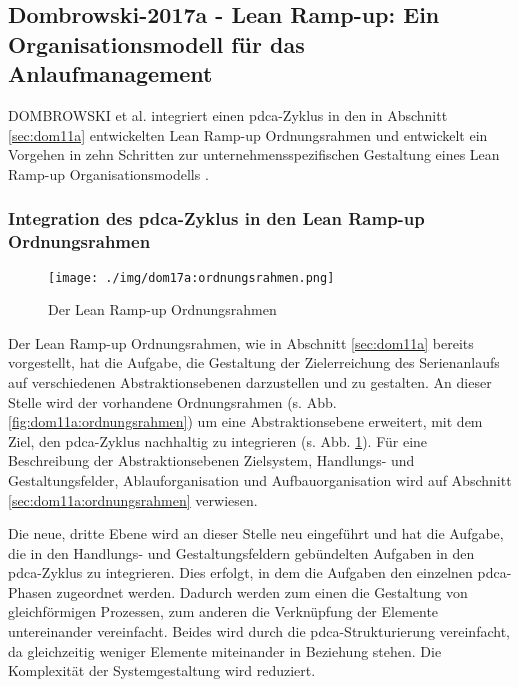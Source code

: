 \subsection*{Dombrowski-2017a - Lean Ramp-up: Ein Organisationsmodell für das Anlaufmanagement}

DOMBROWSKI et al. integriert einen \gls{pdca}-Zyklus in den in Abschnitt \ref{sec:dom11a} entwickelten Lean Ramp-up Ordnungsrahmen und entwickelt ein Vorgehen in zehn Schritten zur unternehmensspezifischen Gestaltung eines Lean Ramp-up Organisationsmodells \autocite{Dombrowski2017a}. 

\subsubsection{Integration des \gls{pdca}-Zyklus in den Lean Ramp-up Ordnungsrahmen}
\begin{figure}[h]
 \centering
 \texttt{[image: ./img/dom17a:ordnungsrahmen.png]}
 \caption[Der Lean Ramp-up Ordnungsrahmen]{Der Lean Ramp-up Ordnungsrahmen \autocite{Dombrowski2017a}}
 \label{fig:dom17a:ordnungsrahmen}
\end{figure}

Der Lean Ramp-up Ordnungsrahmen, wie in Abschnitt \ref{sec:dom11a} bereits vorgestellt, hat die Aufgabe, die Gestaltung der Zielerreichung des Serienanlaufs auf verschiedenen Abstraktionsebenen darzustellen und zu gestalten. 
An dieser Stelle wird der vorhandene Ordnungsrahmen (s. Abb. \ref{fig:dom11a:ordnungsrahmen}) um eine Abstraktionsebene erweitert, mit dem Ziel, den \gls{pdca}-Zyklus nachhaltig zu integrieren (s. Abb. \ref{fig:dom17a:ordnungsrahmen}). 
Für eine Beschreibung der Abstraktionsebenen Zielsystem, Handlungs- und Gestaltungsfelder, Ablauforganisation und Aufbauorganisation wird auf Abschnitt \ref{sec:dom11a:ordnungsrahmen} verwiesen. 

Die neue, dritte Ebene wird an dieser Stelle neu eingeführt und hat die Aufgabe, die in den Handlungs- und Gestaltungsfeldern gebündelten Aufgaben in den \gls{pdca}-Zyklus zu integrieren. Dies erfolgt, in dem die Aufgaben den einzelnen \gls{pdca}-Phasen zugeordnet werden. Dadurch werden zum einen die Gestaltung von gleichförmigen Prozessen, zum anderen die Verknüpfung der Elemente untereinander vereinfacht. Beides wird durch die \gls{pdca}-Strukturierung vereinfacht, da gleichzeitig weniger Elemente miteinander in Beziehung stehen. Die Komplexität der Systemgestaltung wird reduziert. 


